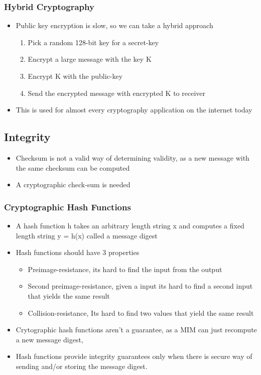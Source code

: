 \documentclass[twoside]{article}
\begin{document}
\subsubsection{Hybrid Cryptography}
\begin{itemize}
\item Public key encryption is slow, so we can take a hybrid approach 
\begin{enumerate}
\item Pick a random 128-bit key for a secret-key
\item Encrypt a large message with the key K
\item Encrypt K with the public-key
\item Send the encrypted message with encrypted K to receiver
\end{enumerate}
\item This is used for almost every cryptography application on the internet today
\end{itemize}

\subsection{Integrity}
\begin{itemize}
\item Checksum is not a valid way of determining validity, as a new message with the same checksum can be computed
\item A cryptographic check-sum is needed
\end{itemize}

\subsubsection{Cryptographic Hash Functions}
\begin{itemize}
\item A hash function h takes an arbitrary length string x and computes a fixed length string y = h(x) called a message digest
\item Hash functions should have 3 properties
\begin{itemize}
\item Preimage-resistance, its hard to find the input from the output
\item Second preimage-resistance, given a input its hard to find a second input that yields the same result
\item Collision-resistance, Its hard to find two values that yield the same result
\end{itemize}
\item Crytographic hash functions aren't a guarantee, as a MIM can just recompute a new message digest,
\item Hash functions provide integrity guarantees only when there is secure way of sending and/or storing the message digest. 
\end{itemize}
\end{document}
